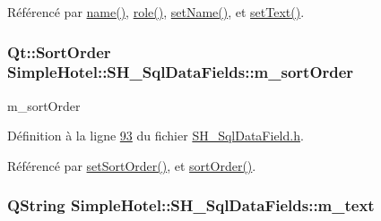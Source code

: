 Référencé par \hyperlink{classSimpleHotel_1_1SH__SqlDataFields_ab1d144346a0909420b80c2fb077a41ac}{name()}, \hyperlink{classSimpleHotel_1_1SH__SqlDataFields_a5fd33c107a02d85963f4c2d3ec4f7dd0}{role()}, \hyperlink{classSimpleHotel_1_1SH__SqlDataFields_a8f12ebe620d294c2f1f8a5f6abdab392}{set\-Name()}, et \hyperlink{classSimpleHotel_1_1SH__SqlDataFields_af4b44c8297ef8d8626bd0bc523b190e7}{set\-Text()}.

\hypertarget{classSimpleHotel_1_1SH__SqlDataFields_a74e2b8edc02a81893ebf642c60ae36ee}{
\subsubsection[{m\-\_\-sort\-Order}]{\setlength{\rightskip}{0pt plus 5cm}Qt\-::\-Sort\-Order Simple\-Hotel\-::\-S\-H\-\_\-\-Sql\-Data\-Fields\-::m\-\_\-sort\-Order\hspace{0.3cm}{\ttfamily [private]}}}\label{classSimpleHotel_1_1SH__SqlDataFields_a74e2b8edc02a81893ebf642c60ae36ee}


m\-\_\-sort\-Order 



Définition à la ligne \hyperlink{SH__SqlDataField_8h_source_l00093}{93} du fichier \hyperlink{SH__SqlDataField_8h_source}{S\-H\-\_\-\-Sql\-Data\-Field.\-h}.



Référencé par \hyperlink{classSimpleHotel_1_1SH__SqlDataFields_ac07613264da2a130e58ffafeaa7744dc}{set\-Sort\-Order()}, et \hyperlink{classSimpleHotel_1_1SH__SqlDataFields_ad9b5b83baf4996d3a7745dc0b731ab7f}{sort\-Order()}.

\hypertarget{classSimpleHotel_1_1SH__SqlDataFields_ab2101660147b6389e7e59872e0f010cf}{
\subsubsection[{m\-\_\-text}]{\setlength{\rightskip}{0pt plus 5cm}Q\-String Simple\-Hotel\-::\-S\-H\-\_\-\-Sql\-Data\-Fields\-::m\-\_\-text\hspace{0.3cm}{\ttfamily [private]}}}\label{classSimpleHotel_1_1SH__SqlDataFields_ab2101660147b6389e7e59872e0f010cf}


